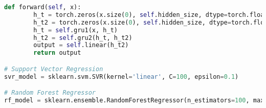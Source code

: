 \begin{lstlisting}[language=Python,label={lst:ml.py}, basicstyle=\scriptsize]
    def forward(self, x):
        h_t = torch.zeros(x.size(0), self.hidden_size, dtype=torch.float32)
        h_t2 = torch.zeros(x.size(0), self.hidden_size, dtype=torch.float32)
        h_t = self.gru1(x, h_t)
        h_t2 = self.gru2(h_t, h_t2)
        output = self.linear(h_t2)
        return output

# Support Vector Regression
svr_model = sklearn.svm.SVR(kernel='linear', C=100, epsilon=0.1)

# Random Forest Regressor
rf_model = sklearn.ensemble.RandomForestRegressor(n_estimators=100, max_depth=10, min_samples_split=2)
\end{lstlisting}